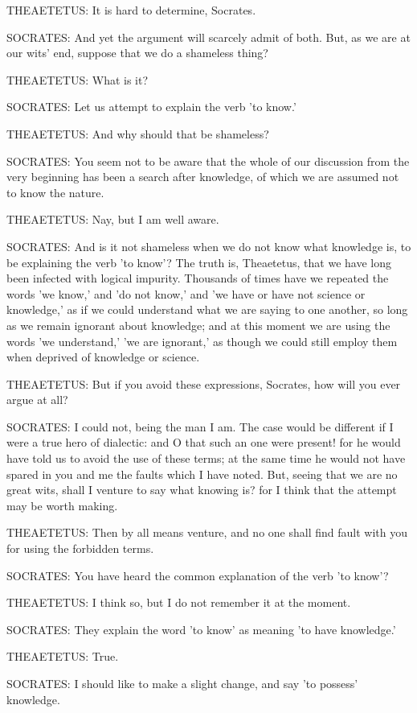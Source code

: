 THEAETETUS: It is hard to determine, Socrates.

SOCRATES: And yet the argument will scarcely admit of both. But, as we
are at our wits' end, suppose that we do a shameless thing?

THEAETETUS: What is it?

SOCRATES: Let us attempt to explain the verb 'to know.'

THEAETETUS: And why should that be shameless?

SOCRATES: You seem not to be aware that the whole of our discussion from
the very beginning has been a search after knowledge, of which we are
assumed not to know the nature.

THEAETETUS: Nay, but I am well aware.

SOCRATES: And is it not shameless when we do not know what knowledge is,
to be explaining the verb 'to know'? The truth is, Theaetetus, that we
have long been infected with logical impurity. Thousands of times have
we repeated the words 'we know,' and 'do not know,' and 'we have or have
not science or knowledge,' as if we could understand what we are saying
to one another, so long as we remain ignorant about knowledge; and at
this moment we are using the words 'we understand,' 'we are ignorant,'
as though we could still employ them when deprived of knowledge or
science.

THEAETETUS: But if you avoid these expressions, Socrates, how will you
ever argue at all?

SOCRATES: I could not, being the man I am. The case would be different
if I were a true hero of dialectic: and O that such an one were present!
for he would have told us to avoid the use of these terms; at the same
time he would not have spared in you and me the faults which I have
noted. But, seeing that we are no great wits, shall I venture to say
what knowing is? for I think that the attempt may be worth making.

THEAETETUS: Then by all means venture, and no one shall find fault with
you for using the forbidden terms.

SOCRATES: You have heard the common explanation of the verb 'to know'?

THEAETETUS: I think so, but I do not remember it at the moment.

SOCRATES: They explain the word 'to know' as meaning 'to have
knowledge.'

THEAETETUS: True.

SOCRATES: I should like to make a slight change, and say 'to possess'
knowledge.

